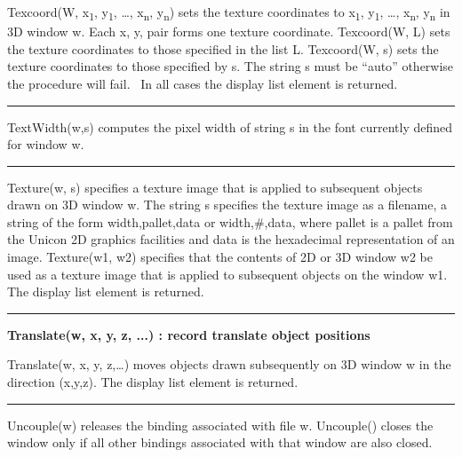 \noindent
\textsf{Texcoord(W, x}\textsf{\textsubscript{1}}\textsf{,
y}\textsf{\textsubscript{1}}\textsf{, {\dots},
x}\textsf{\textsubscript{n}}\textsf{,
y}\textsf{\textsubscript{n}}\textsf{) }sets the texture coordinates to
\textsf{x}\textsf{\textsubscript{1}}\textsf{,
y}\textsf{\textsubscript{1}}\textsf{, {\dots},
x}\textsf{\textsubscript{n}}\textsf{, y}\textsf{\textsubscript{n}} in
3D window w. Each x, y, pair forms one texture coordinate.
\textsf{Texcoord(W, L)} sets the texture coordinates to those specified
in the list \textsf{L}. \textsf{Texcoord(W, s) }sets the texture
coordinates to those specified by \textsf{s}. The string \textsf{s}
must be \textsf{{\textquotedblleft}auto{\textquotedblright}} otherwise
the procedure will fail. \ In all cases the display list element is
returned.

\bigskip\hrule\vspace{0.1cm}

\noindent
\textsf{TextWidth(w,s)} computes the pixel width of string \textsf{s} in
the font currently defined for window \textsf{w}.

\bigskip\hrule\vspace{0.1cm}

\noindent
\textsf{Texture(w, s) }specifies a texture image that is applied to
subsequent objects drawn on 3D window \textsf{w}. The string \textsf{s}
specifies the texture image as a filename, a string of the form
\textsf{width,pallet,data} or \textsf{width,\#,data}, where pallet is a
pallet from the Unicon 2D graphics facilities and data is the
hexadecimal representation of an image. \textsf{Texture(w1, w2)
}specifies that the contents of 2D or 3D window \textsf{w2} be used as
a texture image that is applied to subsequent objects on the window
\textsf{w1}. The display list element is returned.

\bigskip\hrule\vspace{0.1cm}
\noindent
{\bf Translate(w, x, y, z, ...) : record \hfill translate object positions}

\noindent
\textsf{Translate(w, x, y, z,{\dots})} moves objects drawn subsequently
on 3D window w in the direction (\textsf{x,y,z}). The display list
element is returned.

\bigskip\hrule\vspace{0.1cm}

\noindent
\textsf{Uncouple(w)} releases the binding associated with file
\textsf{w}. \textsf{Uncouple()} closes the window only if all other
bindings associated with that window are also closed.

